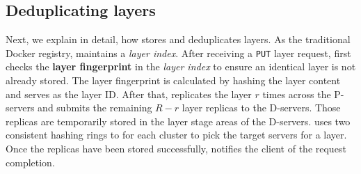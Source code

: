 \subsection{Deduplicating layers}
\label{sec:dedup-desgin}

Next, we explain in detail, how \sysname stores and deduplicates layers.
%
%
As the traditional Docker registry, \sysname maintains a \emph{layer index}.
After receiving a \texttt{PUT} layer request,
\sysname first checks the \textbf{layer fingerprint} in the \emph{layer index} to ensure 
an identical layer is not already stored.
The layer fingerprint is calculated by hashing the layer content 
and serves as the layer ID.
After that, \sysname replicates the layer $r$ times across the P-servers
and submits the remaining $R-r$ layer replicas to the D-servers. Those replicas are
temporarily stored in the layer stage areas of the D-servers. \sysname uses
two consistent hashing rings to for each cluster to pick the target servers for
a layer. Once the replicas
have been stored successfully, \sysname notifies the client of the request completion.
%

